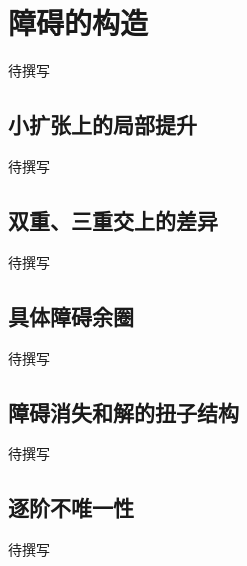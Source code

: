 
% 
% 

\section{障碍的构造}
\label{g5:sec:3203}

待撰写

\subsection{小扩张上的局部提升}
\label{g5:subsec:3203:01}
待撰写

\subsection{双重、三重交上的差异}
\label{g5:subsec:3203:02}
待撰写

\subsection{具体障碍余圈}
\label{g5:subsec:3203:03}
待撰写

\subsection{障碍消失和解的扭子结构}
\label{g5:subsec:3203:04}
待撰写

\subsection{逐阶不唯一性}
\label{g5:subsec:3203:05}
待撰写
